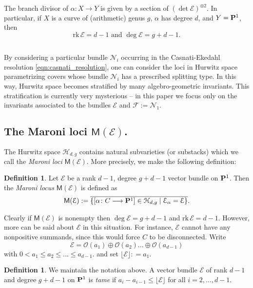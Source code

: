 \documentclass[reqno, 10 pt]{article}
\theoremstyle{definition}
\newtheorem{defn}[thm]{Definition}
\theoremstyle{remark}
\numberwithin{equation}{section}
\numberwithin{thm}{section}
\numberwithin{prop}{section}
\numberwithin{lem}{section}
\numberwithin{cor}{section}
\numberwithin{conj}{section}
\numberwithin{defn}{section}
\renewcommand{\H}{\mathcal H}
\renewcommand{\to}{\longrightarrow}
\newcommand{\sfM}{{\mathsf M}}
\newcommand{\cE}{{\mathcal E}}
\newcommand{\cF}{{\mathcal F}}
\newcommand{\cN}{{\mathcal N}}
\newcommand{\cO}{{\mathcal O}}
\renewcommand{\P}{{\bf P}}
\newcommand {\from}{{\colon}}
\renewcommand{\H}{{\mathcal{H}}}
\newcommand{\rk}{{\text{rk}\,}}
\begin{document}
The branch divisor of $\alpha \from X \to Y$ is given by a section of $(\det \cE)^{\otimes 2}$. In particular, if $X$ is a curve of (arithmetic) genus $g$, $\alpha$ has degree $d$, and $Y = \P^1$, then 
\begin{equation}\label{eqn:rk_deg_E}
 \rk \cE = d-1 \,\, \text{and } \deg \cE = g+d-1.
\end{equation}

\subsection{} By considering a particular bundle $\cN_{i}$ occurring in the Casnati-Ekedahl resolution \eqref{eqn:casnati_resolution}, one can consider the loci in Hurwitz space parametrizing covers whose bundle $\cN_{i}$ has a prescribed splitting type.  In this way, Hurwitz space becomes stratified by many algebro-geometric invariants.  This stratification is currently very mysterious -- in this paper we focus only on the invariants associated to the bundles $\cE$ and $\cF := \cN_{1}$.



\subsection{The Maroni loci $\sfM(\cE)$.}  The Hurwitz space $\H_{d,g}$ contains natural subvarieties (or substacks) which we call the {\sl Maroni loci} $\sfM(\cE)$.  More precisely, we make the following definition:
\begin{defn}\label{def:maroni} Let $\cE$ be a rank $d-1$, degree $g+d-1$ vector bundle on $\P^1$.  Then the {\sl Maroni locus} $\sfM(\cE)$ is defined as
\[\sfM(\cE) := \overline {\{[\alpha \from C \to \P^1] \in \H_{d,g} \mid \cE_{\alpha} = \cE\}}.\] 
\end{defn}

Clearly if $\sfM(\cE)$ is nonempty then  $\deg \cE = g+d-1$ and $\rk \cE = d-1$.  However, more can be said about $\cE$ in this situation.  For instance, $\cE$ cannot have any nonpositive summands, since this would force $C$ to be disconnected.  Write \[\mathcal{E} = \cO(a_{1}) \oplus \cO(a_{2}) ... \oplus \cO(a_{d-1})\] with $0 < a_{1} \leq a_{2} \leq ... \leq a_{d-1}$.   and set $\lfloor \cE \rfloor : = a_{1}$. 
\begin{defn}\label{tame}
We maintain the notation above. A vector bundle $\cE$ of rank $d-1$ and degree $g+d-1$  on $\P^1$ is {\sl tame} if $a_{i} - a_{i-1} \leq \lfloor \cE \rfloor$ for all $i = 2, ... ,d-1$.
\end{defn}
\end{document}
